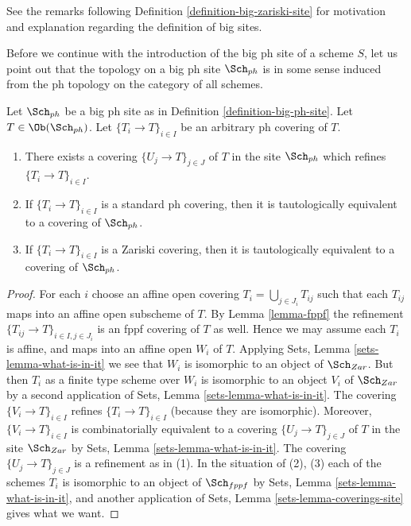 \noindent
See the remarks following Definition \ref{definition-big-zariski-site}
for motivation and explanation regarding the definition of big sites.

\medskip\noindent
Before we continue with the introduction of the big ph site of
a scheme $S$, let us point out that the topology on a big ph site
$\Sch_{ph}$ is in some sense induced from the ph topology
on the category of all schemes.

\begin{lemma}
\label{lemma-ph-induced}
Let $\Sch_{ph}$ be a big ph site as in
Definition \ref{definition-big-ph-site}.
Let $T \in \Ob(\Sch_{ph})$.
Let $\{T_i \to T\}_{i \in I}$ be an arbitrary ph covering of $T$.
\begin{enumerate}
\item There exists a covering $\{U_j \to T\}_{j \in J}$ of $T$ in the site
$\Sch_{ph}$ which refines $\{T_i \to T\}_{i \in I}$.
\item If $\{T_i \to T\}_{i \in I}$ is a standard ph covering, then
it is tautologically equivalent to a covering of $\Sch_{ph}$.
\item If $\{T_i \to T\}_{i \in I}$ is a Zariski covering, then
it is tautologically equivalent to a covering of $\Sch_{ph}$.
\end{enumerate}
\end{lemma}

\begin{proof}
For each $i$ choose an affine open covering $T_i = \bigcup_{j \in J_i} T_{ij}$
such that each $T_{ij}$ maps into an affine open subscheme of $T$. By
Lemma \ref{lemma-fppf}
the refinement $\{T_{ij} \to T\}_{i \in I, j \in J_i}$ is an fppf covering
of $T$ as well. Hence we may assume each $T_i$ is affine, and maps into
an affine open $W_i$ of $T$. Applying
Sets, Lemma \ref{sets-lemma-what-is-in-it}
we see that $W_i$ is isomorphic to an object of $\Sch_{Zar}$.
But then $T_i$ as a finite type scheme over $W_i$
is isomorphic to an object $V_i$ of $\Sch_{Zar}$ by a second
application of
Sets, Lemma \ref{sets-lemma-what-is-in-it}.
The covering $\{V_i \to T\}_{i \in I}$ refines $\{T_i \to T\}_{i \in I}$
(because they are isomorphic).
Moreover, $\{V_i \to T\}_{i \in I}$ is combinatorially equivalent to a
covering $\{U_j \to T\}_{j \in J}$ of $T$ in the site
$\Sch_{Zar}$ by
Sets, Lemma \ref{sets-lemma-what-is-in-it}.
The covering $\{U_j \to T\}_{j \in J}$ is a refinement as in (1).
In the situation of (2), (3) each of the
schemes $T_i$ is isomorphic to an object of $\Sch_{fppf}$ by
Sets, Lemma \ref{sets-lemma-what-is-in-it},
and another application of
Sets, Lemma \ref{sets-lemma-coverings-site}
gives what we want.
\end{proof}


